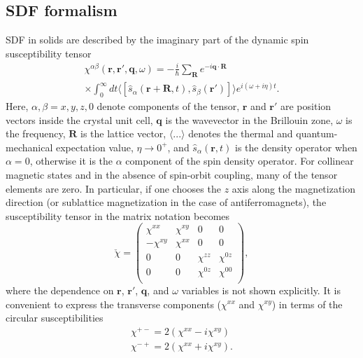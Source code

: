 \subsection{SDF formalism}

SDF in solids are described by the imaginary part of the dynamic spin susceptibility tensor 
\begin{eqnarray}
\nonumber
\chi^{\alpha\beta}(\mathbf{r},\mathbf{r}',\mathbf{q},\omega)= -\frac{i}{\hbar}\sum_{\mathbf{R}}e^{-i\mathbf{q}\cdot\mathbf{R}} \\
\times\int_0^\infty dt\langle[\hat{s}_{\alpha}(\mathbf{r}+\mathbf{R},t),\hat{s}_{\beta}(\mathbf{r}')]\rangle e^{i(\omega+i\eta)t}.
\label{chi}
\end{eqnarray}
Here, $\alpha,\beta=x,y,z,0$ denote components of the tensor, $\mathbf{r}$ and $\mathbf{r}'$ are position vectors inside the crystal unit cell, $\mathbf{q}$ is the wavevector in the Brillouin zone, $\omega$ is the frequency, $\mathbf{R}$ is the lattice vector, $\langle...\rangle$ denotes the thermal and quantum-mechanical expectation value, $\eta\rightarrow 0^+$, and $\hat{s}_\alpha(\mathbf{r},t)$ is the density operator when $\alpha=0$, otherwise it is the $\alpha$ component of the spin density operator. For collinear magnetic states and in the absence of spin-orbit coupling, many of the tensor elements are zero. In particular, if one chooses the $z$ axis along the magnetization direction (or sublattice magnetization in the case of antiferromagnets), the susceptibility tensor in the matrix notation becomes
\begin{equation}
  \check{\chi}=\left(\begin{array}{cccc}
   \chi^{xx} & \chi^{xy} & 0     & 0     \\
  -\chi^{xy} & \chi^{xx} & 0     & 0     \\
   0    & 0     & \chi^{zz} & \chi^{0z} \\
   0    & 0     & \chi^{0z} & \chi^{00} \\
  \end{array}\right),
\label{mchi}
\end{equation}
where the dependence on $\mathbf{r}$, $\mathbf{r}'$, $\mathbf{q}$, and $\omega$ variables is not shown explicitly. It is convenient to express the transverse components ($\chi^{xx}$ and $\chi^{xy}$) in terms of the circular susceptibilities
\begin{eqnarray}
\chi^{+-}=2\left(\chi^{xx}-i\chi^{xy}\right) \\
\chi^{-+}=2\left(\chi^{xx}+i\chi^{xy}\right).
\label{chicirc}
\end{eqnarray}

